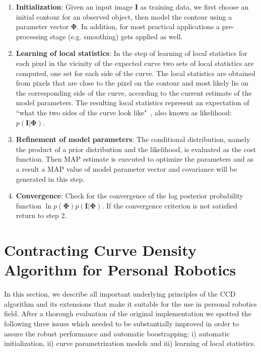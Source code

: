 \documentclass[conference]{IEEEtran}
\begin{document}
\begin{enumerate}
\item \textbf{Initialization}: Given an input image $\mathbf{I}$ as training data, we first choose an initial
  contour for an observed object, then model the contour using a
  parameter vector $\mathbf{\Phi}$. In addition, for most practical
  applications a pre-processing stage (e.g. smoothing) gets applied as well.
\item \textbf{Learning of local statistics}: 
  In the step of learning of local statistics for each pixel in the
  vicinity of the expected curve two sets of local statistics
  are computed, one set for each side of the curve. The local statistics are obtained from
  pixels that are close to the pixel on the contour and most likely lie
  on the corresponding side of the curve, according to the current
  estimate of the model parameters. The resulting local statistics
  represent an expectation of ``what the two sides of the curve look
  like"~\cite{hanek2004contracting}, also known as likelihood: $p(\mathbf{I}|\mathbf{\Phi})$.
\item \textbf{Refinement of model parameters}: The conditional distribution, namely
  the product of a prior distribution and the likelihood, is evaluated
  as the cost function. Then MAP estimate is executed to optimize the
  parameters and as a result a MAP value of model parameter vector and
  covariance will be generated in this step.
\item \textbf{Convergence}: Check for the convergence of the 
  log posterior probability function $\ln{p(\mathbf{\Phi}) p(\mathbf{I}|\mathbf{\Phi})}$. 
  If the convergence criterion is not satisfied return to step 2.
\end{enumerate}

\section{Contracting Curve Density Algorithm for Personal Robotics}
\label{sec:ccd_novelties}
In this section, we describe all important underlying principles of the CCD
algorithm and its extensions that make it suitable for the use in personal robotics field.
After a thorough evaluation of the original implementation we spotted the following three
issues which needed to be substantially improved in order to assure the robust performance
and automatic boostrapping: i) automatic initialization, ii) curve parametrization models and
iii) learning of local statistics.
\end{document}
